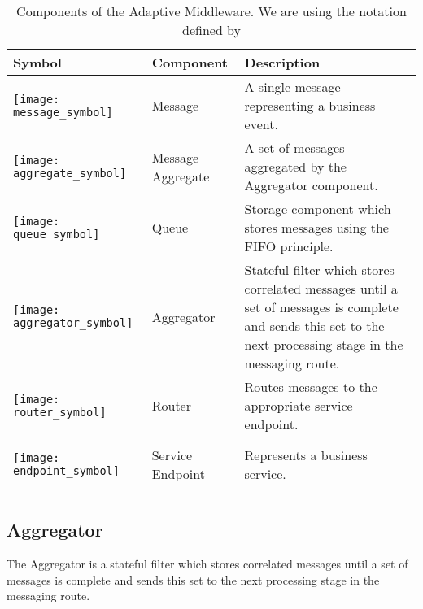 \begin{table}[htpb]
	\caption{Components of the Adaptive Middleware. We are using the notation defined by \cite{Hohpe:2003fk}}
	\label{table:ch4_middleware_components}
	\centering
	\begin{tabular}{|m{3cm}|m{2cm}|m{5cm}|}
		\hline
		\bfseries Symbol & \bfseries Component & \bfseries Description\\
		\hline 
		\begin{center}
			\texttt{[image: message\_symbol]}
		\end{center} 
		& Message & A single message representing a business event.\\
		\hline 
		\begin{center}
			\texttt{[image: aggregate\_symbol]} 
		\end{center}
		& Message Aggregate & A set of messages aggregated by the Aggregator component.\\
		\hline
		\begin{center}
			\texttt{[image: queue\_symbol]} 
		\end{center}
		& Queue & Storage component which stores messages using the \ac{FIFO} principle.\\
		\hline 
		\begin{center}
			\texttt{[image: aggregator\_symbol]}
		\end{center}
		& Aggregator & Stateful filter which stores correlated messages until a set of messages is complete and sends this set to the next processing stage in the messaging route.\\
		\hline
		\begin{center}
			\texttt{[image: router\_symbol]} 
		\end{center}
		& Router & Routes messages to the appropriate service endpoint.\\
		\hline
		\begin{center}
			\texttt{[image: endpoint\_symbol]} 
		\end{center}
		& Service Endpoint & Represents a business service.\\
		\hline
	\end{tabular}
\end{table}

\subsection{Aggregator}
The Aggregator is a stateful filter which stores correlated messages until a set of messages is complete and sends this set to the next processing stage in the messaging route. 


